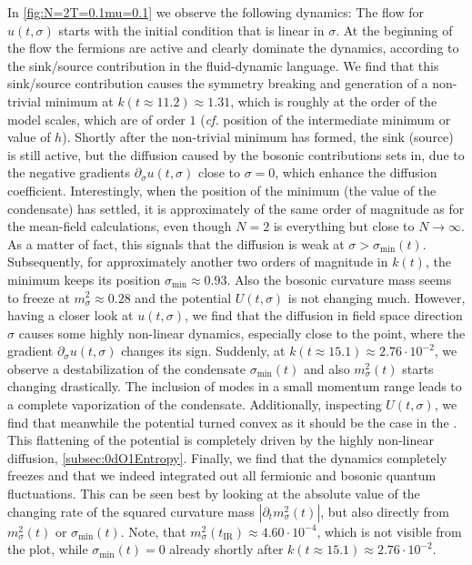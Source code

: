 In \cref{fig:N=2T=0.1mu=0.1} we observe the following dynamics: The flow for $u ( t, \sigma )$ starts with the \uv{} initial condition that is linear in $\sigma$. At the beginning of the flow the fermions are active and clearly dominate the dynamics, according to the sink/source contribution in the fluid-dynamic language. We find that this sink/source contribution causes the \ZII{} symmetry breaking and generation of a non-trivial minimum at $k(t \approx  11.2) \approx 1.31$, which is roughly at the order of the model scales, which are of order $1$ (\textit{cf.} position of the intermediate minimum or value of $h$). Shortly after the non-trivial minimum has formed, the sink (source) is still active, but the diffusion caused by the bosonic contributions sets in, due to the negative gradients $\partial_\sigma u ( t, \sigma )$ close to $\sigma = 0$, which enhance the diffusion coefficient. Interestingly, when the position of the minimum (the value of the condensate) has settled, it is approximately of the same order of magnitude as for the mean-field calculations, even though $N = 2$ is everything but close to $N \rightarrow \infty$. As a matter of fact, this signals that the diffusion is weak at $\sigma > \sigma_\mathrm{min} ( t )$. Subsequently, for approximately another two orders of magnitude in \rgscale{} $k ( t )$, the minimum keeps its position $\sigma_\mathrm{min} \approx 0.93$. Also the bosonic curvature mass seems to freeze at $m_\sigma^2 \approx 0.28$ and the potential $U ( t, \sigma )$ is not changing much. However, having a closer look at $u ( t, \sigma )$, we find that the diffusion in field space direction $\sigma$ causes some highly non-linear dynamics, especially close to the point, where the gradient $\partial_\sigma u ( t, \sigma )$ changes its sign. Suddenly, at $k ( t \approx 15.1) \approx 2.76\cdot10^{-2}$, we observe a destabilization of the condensate $\sigma_\mathrm{min} ( t )$ and also $m_\sigma^2 ( t )$ starts changing drastically. The inclusion of \ir{} modes in a small momentum range leads to a complete vaporization of the condensate. Additionally, inspecting $U ( t, \sigma )$, we find that meanwhile the potential turned convex \dash{} as it should be the case in the \ir{}. This flattening of the potential is completely driven by the highly non-linear diffusion, \cf{} \cref{subsec:0dO1Entropy}. Finally, we find that the dynamics completely freezes and that we indeed integrated out all fermionic and bosonic quantum fluctuations. This can be seen best by looking at the absolute value of the changing rate of the squared curvature mass $| \partial_t m_\sigma^2 ( t ) |$, but also directly from $m_\sigma^2 ( t )$ or $\sigma_\mathrm{min} ( t )$. Note, that $m_\sigma^2 ( t_\mathrm{IR} ) \approx 4.60\cdot10^{-4}$, which is not visible from the plot, while $\sigma_\mathrm{min} ( t ) = 0$ already shortly after $k ( t \approx 15.1) \approx 2.76\cdot10^{-2}$.

